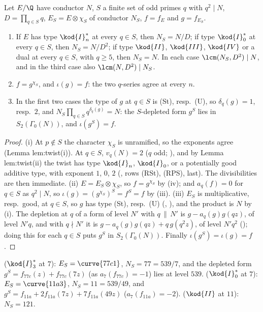 \begin{proposition}\label{prop:modgalrep:twist-levels}
Let $E/\Q$ have conductor $N$, $S$ a finite set of odd primes $q$ with $q^2\mid N$, $D=\prod_{q\in S}q$, $E_S=E\otimes\chi_S$ of conductor $N_S$, $f=f_E$ and $g=f_{E_S}$.
\begin{enumerate}[label=(\roman*)]
\item If $E$ has type $\kod{I}_n^*$ at every $q\in S$, then $N_S=N/D$; if type $\kod{I}_0^*$ at every $q\in S$, then $N_S=N/D^2$; if type $\kod{II}$, $\kod{III}$, $\kod{IV}$ or a dual at every $q\in S$, with $q\ge5$,
then $N_S=N$. In each case $\lcm(N_S,D^2)\mid N$, and in the third case also $\lcm(N,D^2)\mid N_S$.
\item $f=g^{\chi_S}$, and $\iota(g)=f$: the two $q$-series agree at every $n$.
\item In the first two cases the type of $g$ at $q\in S$ is (St), resp.\ (U), so $\delta_q(g)=1$, resp.\ $2$, and $N_S\prod_{q\in S}q^{\delta_q(g)}=N$: the $S$-depleted form $g^S$ lies in
$S_2(\Gamma_0(N))$, and $\iota(g^S)=f$.
\end{enumerate}
\end{proposition}

\begin{proof}
(i) At $p\notin S$ the character $\chi_S$ is unramified, so the exponents agree (Lemma lem:twist(i)). At $q\in S$, $v_q(N)=2$ ($q$ odd; ), and by
Lemma lem:twist(ii) the twist has type $\kod{I}_n$, $\kod{I}_0$, or a potentially good additive type, with exponent $1$, $0$, $2$
(, rows (RSt), (RPS), last). The divisibilities are then immediate. (ii) $E=E_S\otimes\chi_S$, so $f=g^{\chi_S}$ by
(iv); and $a_q(f)=0$ for $q\in S$ as $q^2\mid N$, so $\iota(g)=(g^{\chi_S})^S=f^S=f$ by (iii). (iii) $E_S$ is multiplicative,
resp.\ good, at $q\in S$, so $g$ has type (St), resp.\ (U) (, ), and the product is $N$ by (i). The depletion at
$q$ of a form of level $N'$ with $q\,\|\,N'$ is $g-a_q(g)g(qz)$, of level $N'q$, and with $q\nmid N'$ it is $g-a_q(g)g(qz)+q\,g(q^2z)$, of level $N'q^2$
(); doing this for each $q\in S$ puts $g^S$ in $S_2(\Gamma_0(N))$. Finally $\iota(g^S)=\iota(g)=f$.
\end{proof}

\begin{example}\label{ex:modgalrep:twist-levels-data}
 ($\kod{I}_3^*$ at $7$): $E_S=\curve{77c1}$, $N_S=77=539/7$, and the depleted form
$g^S=f_{77c}(z)+f_{77c}(7z)$ (as $a_7(f_{77c})=-1$) lies at level $539$.  ($\kod{I}_0^*$ at $7$): $E_S=\curve{11a3}$,
$N_S=11=539/49$, and $g^S=f_{11a}+2f_{11a}(7z)+7f_{11a}(49z)$ ($a_7(f_{11a})=-2$).  ($\kod{II}$ at $11$): $N_S=121$.
\end{example}

